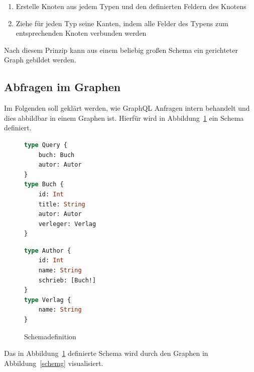 \begin{enumerate}
    \item Erstelle Knoten aus jedem Typen und den definierten Feldern des Knotens
    \item Ziehe für jeden Typ seine Kanten, indem alle Felder des Typens zum entsprechenden Knoten verbunden werden
\end{enumerate}
Nach diesem Prinzip kann aus einem beliebig großen Schema ein gerichteter Graph gebildet werden.
\newpage


\subsection{Abfragen im Graphen}
\label{abfrgraph}

Im Folgenden soll geklärt werden, wie GraphQL Anfragen intern behandelt und dies abbildbar in einem Graphen ist.
Hierfür wird in Abbildung~\ref{schemdef} ein Schema definiert.

\begin{figure}[htb]
    \centering
    \begin{minipage}[h!tb]{0.4\textwidth}
        \begin{lstlisting}[language=GraphQL]
type Query {
    buch: Buch
    autor: Autor
}
type Buch {
    id: Int
    title: String
    autor: Autor
    verleger: Verlag
}
        \end{lstlisting}
    \end{minipage}
    \hfill
    \begin{minipage}[h!tb]{0.4\textwidth}
        \begin{lstlisting}[language=GraphQL]
type Author {
    id: Int
    name: String
    schrieb: [Buch!]
}
type Verlag {
    name: String
}
        \end{lstlisting}
    \end{minipage}
    \caption{Schemadefinition}
    \label{schemdef}
\end{figure}

Das in Abbildung~\ref{schemdef} definierte Schema wird durch den Graphen in Abbildung~\ref{schemg} visualisiert.

